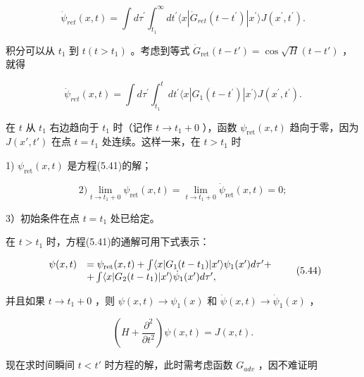 \begin{equation*}
\dot {\psi} _ {r e t} (x, t) = \int d \tau^ {\prime} \int_ {t _ {1}} ^ {\infty} d t ^ {\prime} \langle x | \dot {G} _ {r e t} (t - t ^ {\prime}) | x ^ {\prime} \rangle J (x ^ {\prime}, t ^ {\prime}).
\end{equation*}

积分可以从 $t_1$ 到 $t(t > t_1)$ 。考虑到等式 $\dot{G}_{\mathrm{ret}}(t - t') = \cos \sqrt{H}(t - t')$ ，就得

\begin{equation*}
\dot {\psi} _ {r e t} (x, t) = \int d \tau^ {\prime} \int_ {t _ {1}} ^ {t} d t ^ {\prime} \langle x | G _ {1} (t - t ^ {\prime}) | x ^ {\prime} \rangle J (x ^ {\prime}, t ^ {\prime}).
\end{equation*}

在 $t$ 从 $t_1$ 右边趋向于 $t_1$ 时（记作 $t \to t_1 + 0$ ），函数 $\psi_{\mathrm{ret}}(x, t)$ 趋向于零，因为 $J(x', t')$ 在点 $t = t_1$ 处连续。这样一来，在 $t > t_1$ 时

1) $\psi_{\mathrm{ret}}(x,t)$ 是方程(5.41)的解；

\begin{equation*}
2) \lim _ {t \rightarrow t _ {1} + 0} \psi_ {\text {ret}} (x, t) = \lim _ {t \rightarrow t _ {1} + 0} \dot {\psi} _ {\text {ret}} (x, t) = 0;
\end{equation*}

3）初始条件在点 $t = t_{1}$ 处已给定。

在 $t > t_{1}$ 时，方程(5.41)的通解可用下式表示：

\begin{equation*}
\begin{array}{r l} \psi (x, t) & = \psi_ {\text {ret}} (x, t) + \int \langle x | G _ {1} (t - t _ {1}) | x ^ {\prime} \rangle \psi_ {1} (x ^ {\prime}) d \tau^ {\prime} + \\ & + \int \langle x | G _ {2} (t - t _ {1}) | x ^ {\prime} \rangle \dot {\psi} _ {1} (x ^ {\prime}) d \tau^ {\prime}, \end{array} \tag{5.44}
\end{equation*}

并且如果 $t \to t_1 + 0$ ，则 $\psi(x, t) \to \psi_1(x)$ 和 $\dot {\psi} (x, t) \to \dot {\psi} _ {1} (x)$ ，

\begin{equation*}
\left(H + \frac {\partial^ {2}}{\partial t ^ {2}}\right) \psi (x, t) = J (x, t).
\end{equation*}

现在求时间瞬间 $t < t'$ 时方程的解，此时需考虑函数 $G_{adv}$ ，因不难证明


